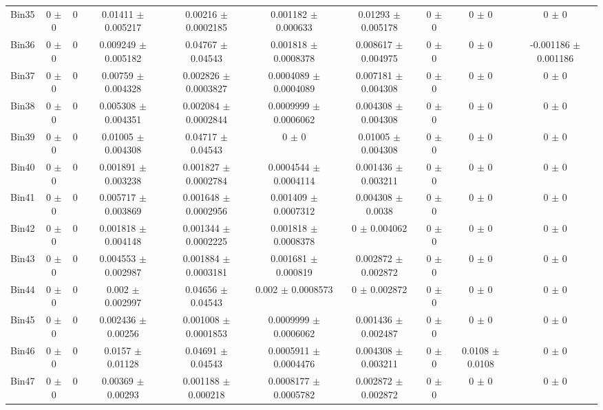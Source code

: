 \begin{tabular}{@{\extracolsep{4pt}}lccccccccc@{}}
     Bin35 & 0 $\pm$ 0 & 0 & 0.01411 $\pm$ 0.005217 & 0.00216 $\pm$ 0.0002185 & 0.001182 $\pm$ 0.000633 & 0.01293 $\pm$ 0.005178 & 0 $\pm$ 0 & 0 $\pm$ 0 & 0 $\pm$ 0 \\ 
     Bin36 & 0 $\pm$ 0 & 0 & 0.009249 $\pm$ 0.005182 & 0.04767 $\pm$ 0.04543 & 0.001818 $\pm$ 0.0008378 & 0.008617 $\pm$ 0.004975 & 0 $\pm$ 0 & 0 $\pm$ 0 & -0.001186 $\pm$ 0.001186 \\ 
     Bin37 & 0 $\pm$ 0 & 0 & 0.00759 $\pm$ 0.004328 & 0.002826 $\pm$ 0.0003827 & 0.0004089 $\pm$ 0.0004089 & 0.007181 $\pm$ 0.004308 & 0 $\pm$ 0 & 0 $\pm$ 0 & 0 $\pm$ 0 \\ 
     Bin38 & 0 $\pm$ 0 & 0 & 0.005308 $\pm$ 0.004351 & 0.002084 $\pm$ 0.0002844 & 0.0009999 $\pm$ 0.0006062 & 0.004308 $\pm$ 0.004308 & 0 $\pm$ 0 & 0 $\pm$ 0 & 0 $\pm$ 0 \\ 
     Bin39 & 0 $\pm$ 0 & 0 & 0.01005 $\pm$ 0.004308 & 0.04717 $\pm$ 0.04543 & 0 $\pm$ 0 & 0.01005 $\pm$ 0.004308 & 0 $\pm$ 0 & 0 $\pm$ 0 & 0 $\pm$ 0 \\ 
     Bin40 & 0 $\pm$ 0 & 0 & 0.001891 $\pm$ 0.003238 & 0.001827 $\pm$ 0.0002784 & 0.0004544 $\pm$ 0.0004114 & 0.001436 $\pm$ 0.003211 & 0 $\pm$ 0 & 0 $\pm$ 0 & 0 $\pm$ 0 \\ 
     Bin41 & 0 $\pm$ 0 & 0 & 0.005717 $\pm$ 0.003869 & 0.001648 $\pm$ 0.0002956 & 0.001409 $\pm$ 0.0007312 & 0.004308 $\pm$ 0.0038 & 0 $\pm$ 0 & 0 $\pm$ 0 & 0 $\pm$ 0 \\ 
     Bin42 & 0 $\pm$ 0 & 0 & 0.001818 $\pm$ 0.004148 & 0.001344 $\pm$ 0.0002225 & 0.001818 $\pm$ 0.0008378 & 0 $\pm$ 0.004062 & 0 $\pm$ 0 & 0 $\pm$ 0 & 0 $\pm$ 0 \\ 
     Bin43 & 0 $\pm$ 0 & 0 & 0.004553 $\pm$ 0.002987 & 0.001884 $\pm$ 0.0003181 & 0.001681 $\pm$ 0.000819 & 0.002872 $\pm$ 0.002872 & 0 $\pm$ 0 & 0 $\pm$ 0 & 0 $\pm$ 0 \\ 
     Bin44 & 0 $\pm$ 0 & 0 & 0.002 $\pm$ 0.002997 & 0.04656 $\pm$ 0.04543 & 0.002 $\pm$ 0.0008573 & 0 $\pm$ 0.002872 & 0 $\pm$ 0 & 0 $\pm$ 0 & 0 $\pm$ 0 \\ 
     Bin45 & 0 $\pm$ 0 & 0 & 0.002436 $\pm$ 0.00256 & 0.001008 $\pm$ 0.0001853 & 0.0009999 $\pm$ 0.0006062 & 0.001436 $\pm$ 0.002487 & 0 $\pm$ 0 & 0 $\pm$ 0 & 0 $\pm$ 0 \\ 
     Bin46 & 0 $\pm$ 0 & 0 & 0.0157 $\pm$ 0.01128 & 0.04691 $\pm$ 0.04543 & 0.0005911 $\pm$ 0.0004476 & 0.004308 $\pm$ 0.003211 & 0 $\pm$ 0 & 0.0108 $\pm$ 0.0108 & 0 $\pm$ 0 \\ 
     Bin47 & 0 $\pm$ 0 & 0 & 0.00369 $\pm$ 0.00293 & 0.001188 $\pm$ 0.000218 & 0.0008177 $\pm$ 0.0005782 & 0.002872 $\pm$ 0.002872 & 0 $\pm$ 0 & 0 $\pm$ 0 & 0 $\pm$ 0 \\ 

\end{tabular}
